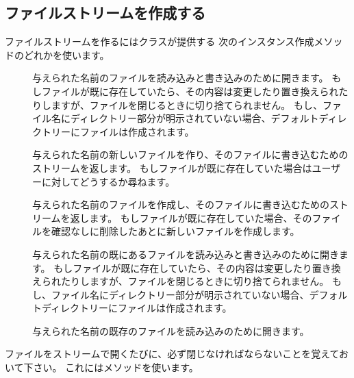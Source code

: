 \documentclass[a4paper,10pt,twoside]{book}
\begin{document}
\subsection{ファイルストリームを作成する}


ファイルストリームを作るにはクラスが提供する
次のインスタンス作成メソッドのどれかを使います。

\begin{description}

\item[] 与えられた名前のファイルを読み込みと書き込みのために開きます。
  もしファイルが既に存在していたら、その内容は変更したり置き換えられたりしますが、ファイルを閉じるときに切り捨てられません。
  もし、ファイル名にディレクトリー部分が明示されていない場合、デフォルトディレクトリーにファイルは作成されます。
  
\item[] 与えられた名前の新しいファイルを作り、そのファイルに書き込むためのストリームを返します。
  もしファイルが既に存在していた場合はユーザーに対してどうするか尋ねます。
  
\item[] 与えられた名前のファイルを作成し、そのファイルに書き込むためのストリームを返します。
  もしファイルが既に存在していた場合、そのファイルを確認なしに削除したあとに新しいファイルを作成します。

\item[] 与えられた名前の既にあるファイルを読み込みと書き込みのために開きます。
  もしファイルが既に存在していたら、その内容は変更したり置き換えられたりしますが、ファイルを閉じるときに切り捨てられません。
  もし、ファイル名にディレクトリー部分が明示されていない場合、デフォルトディレクトリーにファイルは作成されます。

\item[] 与えられた名前の既存のファイルを読み込みのために開きます。

\end{description}

ファイルをストリームで開くたびに、必ず閉じなければならないことを覚えておいて下さい。
これにはメソッドを使います。
\end{document}
